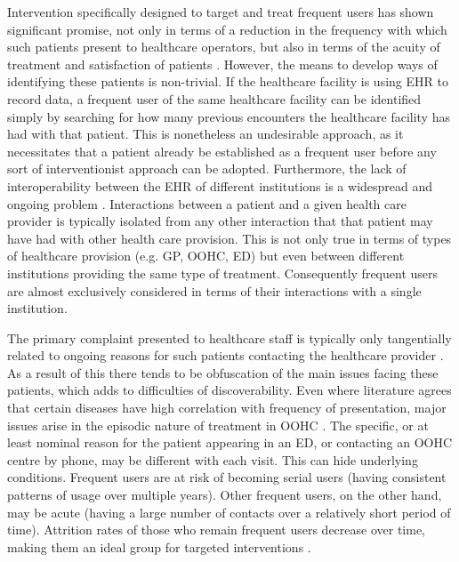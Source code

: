 Intervention specifically designed to target and treat frequent users has shown significant promise, not only in terms of a reduction in the frequency with which such patients present to healthcare operators, but also in terms of the acuity of treatment and satisfaction of patients \cite{billings2013dispelling}. However, the means to develop ways of identifying these patients is non-trivial. If the healthcare facility is using EHR to record data, a frequent user of the same healthcare facility can be identified simply by searching for how many previous encounters the healthcare facility has had with that patient.  This is nonetheless an undesirable approach, as it necessitates that a patient already be established as a frequent user before any sort of interventionist approach can be adopted. Furthermore, the lack of interoperability between the EHR of different institutions is a widespread and ongoing problem \cite{reisman2017ehrs}. Interactions between a patient and a given health care provider is typically isolated from any other interaction that that patient may have had with other health care provision. This is not only true in terms of types of healthcare provision (e.g. GP, OOHC, ED) but even between different institutions providing the same type of treatment. Consequently frequent users are almost exclusively considered in terms of their interactions with a single institution.  

The primary complaint presented to healthcare staff is typically only tangentially related to ongoing reasons for such patients contacting the healthcare provider \cite{bhroin2019profiling}. As a result of this there tends to be obfuscation of the main issues facing these patients, which adds to difficulties of discoverability. Even where literature agrees that certain diseases have high correlation with frequency of presentation, major issues arise in the episodic nature of treatment in OOHC \cite{krieg2016individual}. The specific, or at least nominal reason for the patient appearing in an ED, or contacting an OOHC centre by phone, may be different with each visit.  This can hide underlying conditions. Frequent users are at risk of becoming serial users (having consistent patterns of usage over multiple years). Other frequent users, on the other hand, may be acute (having a large number of contacts over a relatively short period of time).  Attrition rates of those who remain frequent users decrease over time, making them an ideal group for targeted interventions \cite{krieg2016individual}. 

